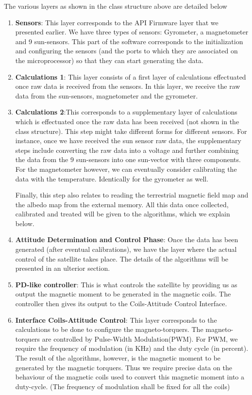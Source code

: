 \documentclass[11pt,a4paper]{report}
\begin{document}
The various layers as shown in the class structure above are detailed below 

\begin{enumerate}
\item 
\textbf{Sensors}: This layer corresponds to the API Firmware layer that we presented earlier. We have three types of sensors: Gyrometer, a magnetometer and 9 sun-sensors. This part of the software corresponds to the initialization and configuring the sensors (and the ports to which they are associated on the microprocessor) so that they can start generating the data. 
\item 
\textbf{Calculations 1}: This layer consists of a first layer of calculations effectuated once raw data is received from the sensors. In this layer, we receive the raw data from the sun-sensors, magnetometer and the gyrometer. 

\item 
\textbf{Calculations 2}:This corresponds to a supplementary layer of calculations which is effectuated once the raw data has been received (not shown in the class structure). This step might take different forms for different sensors. For instance, once we have received the sun sensor raw data, the supplementary steps include converting the raw data into a voltage and further combining the data from the 9 sun-sensors into one sun-vector with three components. For the magnetometer however, we can eventually consider calibrating the data with the temperature. Identically for the gyrometer as well. 

Finally, this step also relates to reading the terrestrial magnetic field map and the albedo map from the external memory. All this data once collected, calibrated and treated will be given to the algorithms, which we explain below. 

\item 
\textbf{Attitude Determination and Control Phase}: Once the data has been generated (after eventual calibrations), we have the layer where the actual control of the satellite takes place. The details of the algorithms will be presented in an ulterior section. 

\item
\textbf{PD-like controller}: This is what controls the satellite by providing us as output the magnetic moment to be generated in the magnetic coils. The controller then gives its output to the Coils-Attitude Control Interface. 

\item 
\textbf{Interface Coils-Attitude Control}: This layer corresponds to the calculations to be done to configure the magneto-torquers. The magneto-torquers are controlled by Pulse-Width Modulation(PWM). For PWM, we require the frequency of modulation (in KHz) and the duty cycle (in percent). The result of the algorithms, however, is the magnetic moment to be generated by the magnetic torquers. Thus we require precise data on the behaviour of the magnetic coils used to convert this magnetic moment into a duty-cycle. (The frequency of modulation shall be fixed for all the coils)


\end{enumerate}
\end{document}
